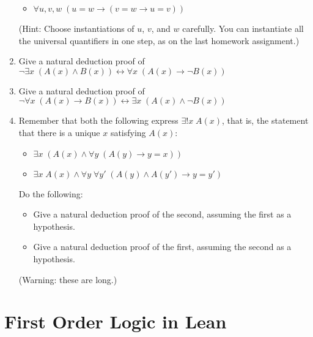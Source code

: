 \documentclass[letterpaper,10pt,english]{sphinxmanual}
\begin{document}
\begin{enumerate}
\begin{itemize}
\item {} 
\sphinxAtStartPar
\(\forall u, v, w \; (u = w \to (v = w \to u = v))\)

\end{itemize}

\sphinxAtStartPar
(Hint: Choose instantiations of \(u\), \(v\), and \(w\) carefully. You can instantiate all the universal quantifiers in one step, as on the last homework assignment.)

\item {} 
\sphinxAtStartPar
Give a natural deduction proof of \(\neg \exists x \; (A(x) \wedge B(x)) \leftrightarrow \forall x \; (A(x) \to \neg B(x))\)

\item {} 
\sphinxAtStartPar
Give a natural deduction proof of \(\neg \forall x \; (A(x) \to B(x)) \leftrightarrow \exists x \; (A(x) \wedge \neg B(x))\)

\item {} 
\sphinxAtStartPar
Remember that both the following express \(\exists!x \; A(x)\), that is, the statement that there is a unique \(x\) satisfying \(A(x)\):
\begin{itemize}
\item {} 
\sphinxAtStartPar
\(\exists x \; (A(x) \wedge \forall y \; (A(y) \to y = x))\)

\item {} 
\sphinxAtStartPar
\(\exists x \; A(x) \wedge \forall y \; \forall y' \; (A(y) \wedge A(y') \to y = y')\)

\end{itemize}

\sphinxAtStartPar
Do the following:
\begin{itemize}
\item {} 
\sphinxAtStartPar
Give a natural deduction proof of the second, assuming the first as a hypothesis.

\item {} 
\sphinxAtStartPar
Give a natural deduction proof of the first, assuming the second as a hypothesis.

\end{itemize}

\sphinxAtStartPar
(Warning: these are long.)

\end{enumerate}


\chapter{First Order Logic in Lean}
\label{\detokenize{first_order_logic_in_lean:first-order-logic-in-lean}}\label{\detokenize{first_order_logic_in_lean:id1}}\label{\detokenize{first_order_logic_in_lean::doc}}
\end{document}
